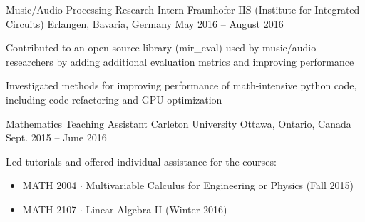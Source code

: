 

\begin{cventries}

  \cventry
    {Music/Audio Processing Research Intern} %
    {Fraunhofer IIS (Institute for Integrated Circuits)} %
    {Erlangen, Bavaria, Germany} %
    {May 2016 – August 2016} %
    {
      \begin{cvitems} %
        \item {Contributed to an open source library (mir\_eval) used by music/audio researchers by adding additional evaluation metrics and improving performance}
        \item {Investigated methods for improving performance of math-intensive python code, including code refactoring and GPU optimization}
      \end{cvitems}
    }

  \cventry
    {Mathematics Teaching Assistant} %
    {Carleton University} %
    {Ottawa, Ontario, Canada} %
    {Sept. 2015 – June 2016} %
    {
      \begin{cvitems} %
        \item {Led tutorials and offered individual assistance for the courses:}
          \begin{itemize}
            \item {MATH 2004 $\cdot$ Multivariable Calculus for Engineering or Physics (Fall 2015)}
            \item {MATH 2107 $\cdot$ Linear Algebra II (Winter 2016)}
          \end{itemize}
      \end{cvitems}
    }


\end{cventries}
